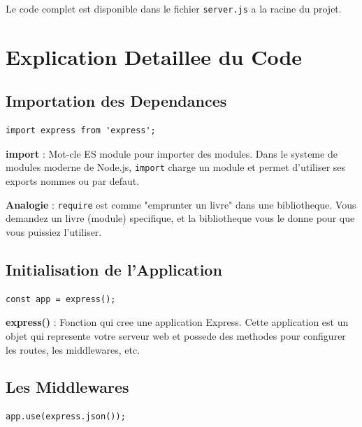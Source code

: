 \documentclass[a4paper,12pt]{book}
\begin{document}
Le code complet est disponible dans le fichier \texttt{server.js} a la racine du projet.

\section{Explication Detaillee du Code}

\subsection{Importation des Dependances}

\begin{lstlisting}[style=javascript]
import express from 'express';
\end{lstlisting}

\begin{definitionbox}
    \textbf{import} : Mot-cle ES module pour importer des modules. Dans le systeme de modules moderne de Node.js, \texttt{import} charge un module et permet d'utiliser ses exports nommes ou par defaut.
\end{definitionbox}

\begin{analogybox}
    \textbf{Analogie} : \texttt{require} est comme "emprunter un livre" dans une bibliotheque. Vous demandez un livre (module) specifique, et la bibliotheque vous le donne pour que vous puissiez l'utiliser.
\end{analogybox}

\subsection{Initialisation de l'Application}

\begin{lstlisting}[style=javascript]
const app = express();
\end{lstlisting}

\begin{definitionbox}
    \textbf{express()} : Fonction qui cree une application Express. Cette application est un objet qui represente votre serveur web et possede des methodes pour configurer les routes, les middlewares, etc.
\end{definitionbox}

\subsection{Les Middlewares}

\begin{lstlisting}[style=javascript]
app.use(express.json());
\end{lstlisting}
\end{document}
